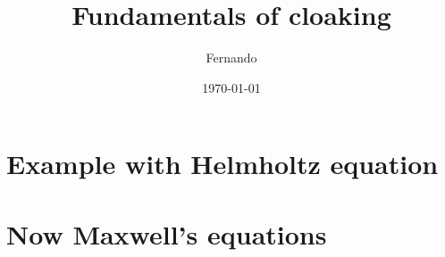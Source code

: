 \documentclass{article}
\begin{document}
\title{Fundamentals of cloaking}
\author{Fernando}
\date{\today}

\section{Example with Helmholtz equation}
% 
\section{Now Maxwell's equations}

\end{document}
